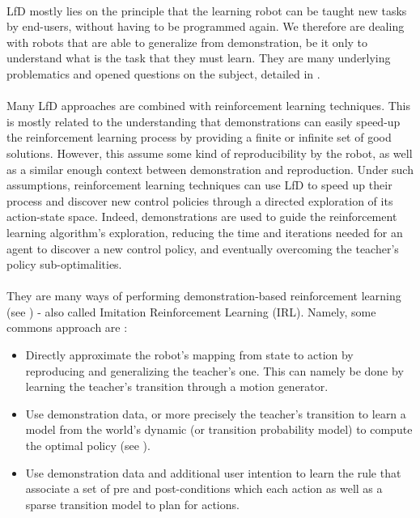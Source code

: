 \documentclass[a4paper]{report}
\begin{document}
{{				\paragraph{} LfD mostly lies on the principle that the learning robot can be taught new tasks by end-users, without having to be programmed again. We therefore are dealing with robots that are able to generalize from demonstration, be it only to understand what is the task that they must learn. They are many underlying problematics and opened questions on the subject, detailed in \cite{Billard2016}.
				
				\paragraph{}Many LfD approaches are combined with reinforcement learning techniques. This is mostly related to the understanding that demonstrations can easily speed-up the reinforcement learning process by providing a finite or infinite set of good solutions. However, this assume some kind of reproducibility by the robot, as well as a similar enough context between demonstration and reproduction. \newline
				Under such assumptions, reinforcement learning techniques can use LfD to speed up their process and discover new control policies through a directed exploration of its action-state space. Indeed, demonstrations are used to guide the reinforcement learning algorithm's exploration, reducing the time and iterations needed for an agent to discover a new control policy, and eventually overcoming the teacher's  policy sub-optimalities. 
				
				\paragraph{} They are many ways of performing demonstration-based reinforcement learning (see \cite{argall2009survey}) - also called Imitation Reinforcement Learning (IRL). Namely, some commons approach are : 
				\begin{itemize}[label=$\color{red}\blacktriangleright$]
					\item Directly approximate the robot's mapping from state to action by reproducing and generalizing the teacher's one. This can namely be done by learning the teacher's transition through a motion generator. 
					\item Use demonstration data, or more precisely the teacher's transition to learn a model from the world's dynamic (or transition probability model) to compute the optimal policy (see \cite{price2003accelerating}). 
					\item Use demonstration data and additional user intention to learn the rule that associate a set of pre and post-conditions which each action as well as a sparse transition model to plan for actions. 
				\end{itemize}
				
}}
\end{document}
